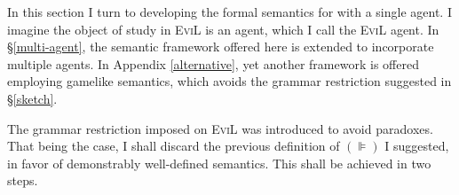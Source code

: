 In this section I turn to developing the formal semantics for
 with a single agent.  I imagine the object of study in
\textsc{EviL} is an agent, which I call the \textsc{EviL} agent.  In
\S\ref{multi-agent}, the semantic framework offered here is extended to
incorporate multiple agents. In Appendix \ref{alternative}, yet another
framework is offered employing gamelike semantics, which avoids the
grammar restriction suggested in \S\ref{sketch}.  %

The grammar restriction imposed on \textsc{EviL} was introduced to
avoid paradoxes. That being the case, I shall discard the previous
definition of $(\VDash)$ I suggested, in favor of demonstrably well-defined semantics.  This shall be achieved in two steps.

